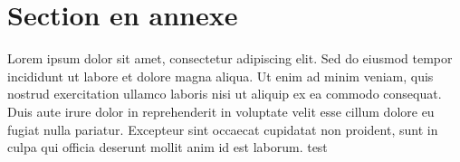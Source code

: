 \documentclass[a4paper]{article}
\begin{document}

\nocite{*}



\appendix

\section{Section en annexe}

Lorem ipsum dolor sit amet, consectetur adipiscing elit. Sed do eiusmod tempor
incididunt ut labore et dolore magna aliqua. Ut enim ad minim veniam, quis
nostrud exercitation ullamco laboris nisi ut aliquip ex ea commodo consequat.
Duis aute irure dolor in reprehenderit in voluptate velit esse cillum dolore eu
fugiat nulla pariatur. Excepteur sint occaecat cupidatat non proident, sunt in
culpa qui officia deserunt mollit anim id est laborum.
test
\end{document}
